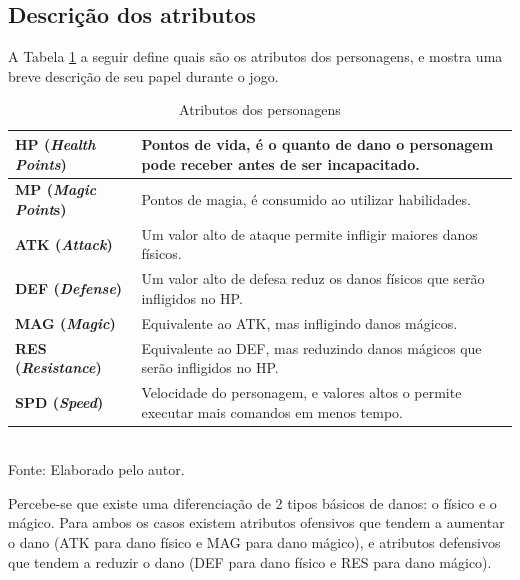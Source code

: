 \documentclass[
	12pt,					%
	openright,				%
	oneside,				%
	a4paper,				%
	bibjustif,				%
	chapter=TITLE,			%
	english,				%
	brazil,					%
	]{abntex2}
\newcommand{\source}[1]{\small Fonte: {#1}}
\begin{document}
	\subsection{Descrição dos atributos}
	A Tabela \ref{tab:characterStats} a seguir define quais são os atributos dos personagens,
	e mostra uma breve descrição de seu papel durante o jogo.
	
	\begin{table}[h]
		\caption{Atributos dos personagens}
		\centering
		\small
		\renewcommand{\arraystretch}{1.2} %
		\begin{tabular}{>{\centering\arraybackslash}m{3.5cm} m{11.5cm}}
			\hline 
			\textbf{HP (\textit{Health Points})} & Pontos de vida, é o quanto de dano o personagem pode receber antes de ser incapacitado. \\ 
			\hline 
			\textbf{MP (\textit{Magic Point}s)} & Pontos de magia, é consumido ao utilizar habilidades. \\ 
			\hline 
			\textbf{ATK (\textit{Attack})} & Um valor alto de ataque permite infligir maiores danos físicos. \\ 
			\hline 
			\textbf{DEF (\textit{Defense})} & Um valor alto de defesa reduz os danos físicos que serão infligidos no HP. \\ 
			\hline 
			\textbf{MAG (\textit{Magic})} & Equivalente ao ATK, mas infligindo danos mágicos. \\ 
			\hline 
			\textbf{RES (\textit{Resistance})} & Equivalente ao DEF, mas reduzindo danos mágicos que serão infligidos no HP. \\ 
			\hline 
			\textbf{SPD (\textit{Speed})} & Velocidade do personagem, e valores altos o permite executar mais comandos em menos tempo. \\ 
			\hline 
		\end{tabular}\\
		\vspace{3mm}
		\source{Elaborado pelo autor.}
		\label{tab:characterStats}
	\end{table}
	
	Percebe-se que existe uma diferenciação de 2 tipos básicos de danos:
	o físico e o mágico.
	Para ambos os casos
	existem atributos ofensivos que tendem a aumentar o dano (ATK para dano físico e MAG para dano mágico),
	e atributos defensivos que tendem a reduzir o dano (DEF para dano físico e RES para dano mágico).
	
\end{document}
